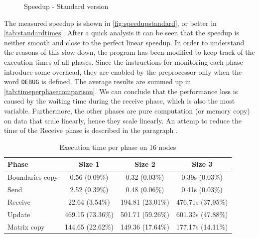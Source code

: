 \documentclass{article}
\begin{document}
\begin{figure}
\centering
{}
\caption{Speedup - Standard version}
\label{fig:speedupstandard}
\end{figure}
The measured speedup is shown in \autoref{fig:speedupstandard}, or better in \autoref{tab:standardtimes}. After a quick analysis it can be seen that the speedup is neither smooth and close to the perfect linear speedup. In order to understand the reasons of this slow down, the program has been modified to keep track of the execution times of all phases. Since the instructions for monitoring each phase introduce some overhead, they are enabled by the preprocessor only when the word \texttt{DEBUG} is defined. The average results are summed up in \autoref{tab:timeperphasecomparison}. We can conclude that the performance loss is caused by the waiting time during the receive phase, which is also the most variable. Furthermore, the other phases are pure computation (or memory copy) on data that scale linearly, hence they scale linearly. An attemp to reduce the time of the Receive phase is described in the paragraph .


\begin{table}
\centering
\begin{tabular}{|l|c|c|c|}
\hline
Phase & Size 1 & Size 2 & Size 3 \\
\hline
Boundaries copy & 0.56 (0.09\%) & 0.32 (0.03\%) & 0.39s (0.03\%) \\
\hline
Send & 2.52 (0.39\%) & 0.48 (0.06\%) & 0.41s (0.03\%) \\
\hline
Receive & 22.64 (3.54\%) & 194.81 (23.01\%) & 476.71s (37.95\%) \\
\hline
Update & 469.15 (73.36\%) & 501.71 (59.26\%) & 601.32s (47.88\%) \\
\hline
Matrix copy & 144.65 (22.62\%) & 149.36 (17.64\%) & 177.17s (14.11\%) \\
\hline
\end{tabular}
\caption{Execution time per phase on 16 nodes} \label{tab:timeperphasecomparison}
\end{table}
\end{document}
